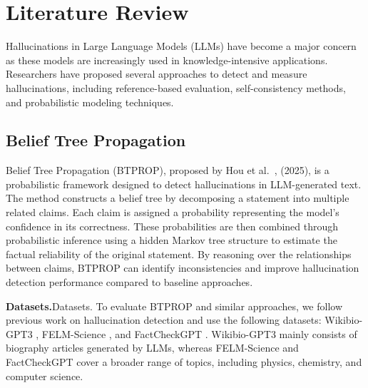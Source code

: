 \section{Literature Review}

Hallucinations in Large Language Models (LLMs) have become a major concern as these models are increasingly used in knowledge-intensive applications. Researchers have proposed several approaches to detect and measure hallucinations, including reference-based evaluation, self-consistency methods, and probabilistic modeling techniques.

\subsection{Belief Tree Propagation}

Belief Tree Propagation (BTPROP), proposed by Hou et al.~\cite{hou2025btprop}, (2025), is a probabilistic framework designed to detect hallucinations in LLM-generated text. The method constructs a belief tree by decomposing a statement into multiple related claims. Each claim is assigned a probability representing the model’s confidence in its correctness. These probabilities are then combined through probabilistic inference using a hidden Markov tree structure to estimate the factual reliability of the original statement. By reasoning over the relationships between claims, BTPROP can identify inconsistencies and improve hallucination detection performance compared to baseline approaches.

\textbf{Datasets.}Datasets. To evaluate BTPROP and similar approaches, we follow previous
work on hallucination detection \cite{manakul2023selfcheckgpt, chen2023felm}
and use the following datasets: Wikibio-GPT3 \cite{manakul2023selfcheckgpt},
FELM-Science \cite{chen2023felm}, and FactCheckGPT \cite{wang2023factcheckgpt}.
Wikibio-GPT3 mainly consists of biography articles generated by LLMs,
whereas FELM-Science and FactCheckGPT cover a broader range of topics,
including physics, chemistry, and computer science.

\begin{table}[h]
\centering
\caption{Probabilistic Approaches for Hallucination Detection in LLMs}
\end{table}

